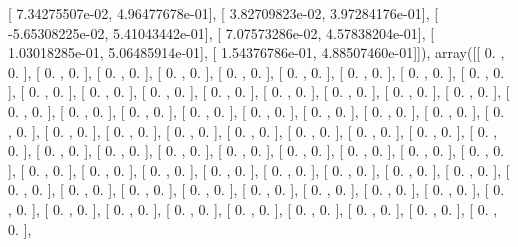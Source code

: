 \documentclass{article}
\begin{document}
       [  7.34275507e-02,   4.96477678e-01],
       [  3.82709823e-02,   3.97284176e-01],
       [ -5.65308225e-02,   5.41043442e-01],
       [  7.07573286e-02,   4.57838204e-01],
       [  1.03018285e-01,   5.06485914e-01],
       [  1.54376786e-01,   4.88507460e-01]]), array([[ 0.        ,  0.        ],
       [ 0.        ,  0.        ],
       [ 0.        ,  0.        ],
       [ 0.        ,  0.        ],
       [ 0.        ,  0.        ],
       [ 0.        ,  0.        ],
       [ 0.        ,  0.        ],
       [ 0.        ,  0.        ],
       [ 0.        ,  0.        ],
       [ 0.        ,  0.        ],
       [ 0.        ,  0.        ],
       [ 0.        ,  0.        ],
       [ 0.        ,  0.        ],
       [ 0.        ,  0.        ],
       [ 0.        ,  0.        ],
       [ 0.        ,  0.        ],
       [ 0.        ,  0.        ],
       [ 0.        ,  0.        ],
       [ 0.        ,  0.        ],
       [ 0.        ,  0.        ],
       [ 0.        ,  0.        ],
       [ 0.        ,  0.        ],
       [ 0.        ,  0.        ],
       [ 0.        ,  0.        ],
       [ 0.        ,  0.        ],
       [ 0.        ,  0.        ],
       [ 0.        ,  0.        ],
       [ 0.        ,  0.        ],
       [ 0.        ,  0.        ],
       [ 0.        ,  0.        ],
       [ 0.        ,  0.        ],
       [ 0.        ,  0.        ],
       [ 0.        ,  0.        ],
       [ 0.        ,  0.        ],
       [ 0.        ,  0.        ],
       [ 0.        ,  0.        ],
       [ 0.        ,  0.        ],
       [ 0.        ,  0.        ],
       [ 0.        ,  0.        ],
       [ 0.        ,  0.        ],
       [ 0.        ,  0.        ],
       [ 0.        ,  0.        ],
       [ 0.        ,  0.        ],
       [ 0.        ,  0.        ],
       [ 0.        ,  0.        ],
       [ 0.        ,  0.        ],
       [ 0.        ,  0.        ],
       [ 0.        ,  0.        ],
       [ 0.        ,  0.        ],
       [ 0.        ,  0.        ],
       [ 0.        ,  0.        ],
       [ 0.        ,  0.        ],
       [ 0.        ,  0.        ],
       [ 0.        ,  0.        ],
       [ 0.        ,  0.        ],
       [ 0.        ,  0.        ],
       [ 0.        ,  0.        ],
       [ 0.        ,  0.        ],
       [ 0.        ,  0.        ],
       [ 0.        ,  0.        ],
       [ 0.        ,  0.        ],
       [ 0.        ,  0.        ],
       [ 0.        ,  0.        ],
       [ 0.        ,  0.        ],
       [ 0.        ,  0.        ],
       [ 0.        ,  0.        ],
       [ 0.        ,  0.        ],
\end{document}
